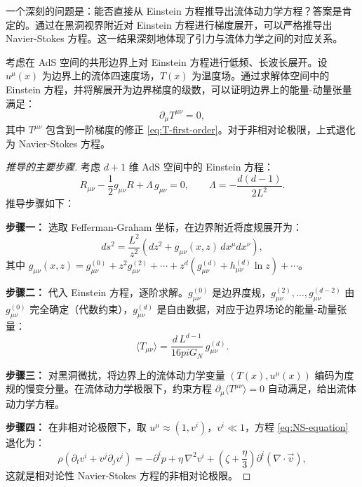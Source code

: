 \begin{note}[物理动机]
一个深刻的问题是：能否直接从 Einstein 方程推导出流体动力学方程？答案是肯定的。通过在黑洞视界附近对 Einstein 方程进行梯度展开，可以严格推导出 Navier-Stokes 方程。这一结果深刻地体现了引力与流体力学之间的对应关系。
\end{note}

\begin{theorem}\label{thm:Einstein-to-NS}
考虑在 AdS 空间的共形边界上对 Einstein 方程进行低频、长波长展开。设 $u^\mu(x)$ 为边界上的流体四速度场，$T(x)$ 为温度场。通过求解体空间中的 Einstein 方程，并将解展开为边界梯度的级数，可以证明边界上的能量-动量张量满足：
\begin{equation}\label{eq:NS-equation}
    \partial_\mu T^{\mu\nu} = 0,
\end{equation}
其中 $T^{\mu\nu}$ 包含到一阶梯度的修正 \eqref{eq:T-first-order}。对于非相对论极限，上式退化为 Navier-Stokes 方程。
\end{theorem}

\begin{proof}[推导的主要步骤]
考虑 $d+1$ 维 AdS 空间中的 Einstein 方程：
\begin{equation}
    R_{\mu\nu} - \frac{1}{2}g_{\mu\nu}R + \Lambda\,g_{\mu\nu} = 0, \qquad \Lambda = -\frac{d(d-1)}{2L^2}.
\end{equation}
推导步骤如下：

\textbf{步骤一：} 选取 Fefferman-Graham 坐标，在边界附近将度规展开为：
\begin{equation}
    ds^2 = \frac{L^2}{z^2}\left(dz^2 + g_{\mu\nu}(x,z)\,dx^\mu dx^\nu\right),
\end{equation}
其中 $g_{\mu\nu}(x,z) = g_{\mu\nu}^{(0)} + z^2 g_{\mu\nu}^{(2)} + \cdots + z^d\left(g_{\mu\nu}^{(d)} + h_{\mu\nu}^{(d)}\ln z\right) + \cdots$。

\textbf{步骤二：} 代入 Einstein 方程，逐阶求解。$g_{\mu\nu}^{(0)}$ 是边界度规，$g_{\mu\nu}^{(2)}, \ldots, g_{\mu\nu}^{(d-2)}$ 由 $g_{\mu\nu}^{(0)}$ 完全确定（代数约束），$g_{\mu\nu}^{(d)}$ 是自由数据，对应于边界场论的能量-动量张量：
\begin{equation}
    \langle T_{\mu\nu} \rangle = \frac{d\,L^{d-1}}{16pi G_N}\,g_{\mu\nu}^{(d)}.
\end{equation}

\textbf{步骤三：} 对黑洞微扰，将边界上的流体动力学变量 $(T(x), u^\mu(x))$ 编码为度规的慢变分量。在流体动力学极限下，约束方程 $\partial_\mu \langle T^{\mu\nu}\rangle = 0$ 自动满足，给出流体动力学方程。

\textbf{步骤四：} 在非相对论极限下，取 $u^\mu \approx (1, v^i)$，$v^i \ll 1$，方程 \eqref{eq:NS-equation} 退化为：
\begin{equation}\label{eq:Navier-Stokes}
    \rho\left(\partial_t v^i + v^j\partial_j v^i\right) = -\partial^i p + \eta\,\nabla^2 v^i + \left(\zeta + \frac{\eta}{3}\right)\partial^i(\nabla\cdot\vec{v}),
\end{equation}
这就是相对论性 Navier-Stokes 方程的非相对论极限。
\end{proof}

